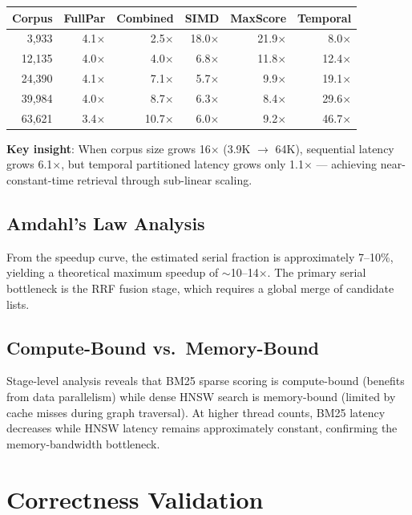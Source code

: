 \documentclass[11pt]{article}
\begin{document}
\begin{center}
\begin{tabular}{rrrrrr}
\toprule
\textbf{Corpus} & \textbf{FullPar} & \textbf{Combined} & \textbf{SIMD} & \textbf{MaxScore} & \textbf{Temporal} \\
\midrule
3,933   & 4.1$\times$ & 2.5$\times$ & 18.0$\times$ & 21.9$\times$ & 8.0$\times$ \\
12,135  & 4.0$\times$ & 4.0$\times$ & 6.8$\times$  & 11.8$\times$ & 12.4$\times$ \\
24,390  & 4.1$\times$ & 7.1$\times$ & 5.7$\times$  & 9.9$\times$  & 19.1$\times$ \\
39,984  & 4.0$\times$ & 8.7$\times$ & 6.3$\times$  & 8.4$\times$  & 29.6$\times$ \\
63,621  & 3.4$\times$ & 10.7$\times$ & 6.0$\times$ & 9.2$\times$  & 46.7$\times$ \\
\bottomrule
\end{tabular}
\end{center}

\noindent \textbf{Key insight}: When corpus size grows 16$\times$ (3.9K $\to$ 64K), sequential latency grows 6.1$\times$, but temporal partitioned latency grows only 1.1$\times$ --- achieving near-constant-time retrieval through sub-linear scaling.

\subsection{Amdahl's Law Analysis}
From the speedup curve, the estimated serial fraction is approximately 7--10\%, yielding a theoretical maximum speedup of $\sim$10--14$\times$. The primary serial bottleneck is the RRF fusion stage, which requires a global merge of candidate lists.

\subsection{Compute-Bound vs.\ Memory-Bound}
Stage-level analysis reveals that BM25 sparse scoring is compute-bound (benefits from data parallelism) while dense HNSW search is memory-bound (limited by cache misses during graph traversal). At higher thread counts, BM25 latency decreases while HNSW latency remains approximately constant, confirming the memory-bandwidth bottleneck.

\section{Correctness Validation}
\end{document}
